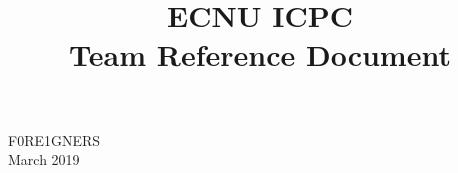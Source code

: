 \documentclass[10pt]{article} %
\title{\vspace{-4ex}\Large{ECNU ICPC \\ Team Reference Document}}
\author{}
\date{}
\begin{document}
\begin{landscape}
\begin{multicols}{2}

\maketitle
\vspace{-10ex}

\hspace*{-\parindent}%
\begin{minipage}{0.45\linewidth}
\begin{center}
F0RE1GNERS \\
March 2019
\end{center}
\end{minipage}

\tableofcontents
\pagestyle{fancy}



\end{multicols}



\end{landscape}
\end{document}
